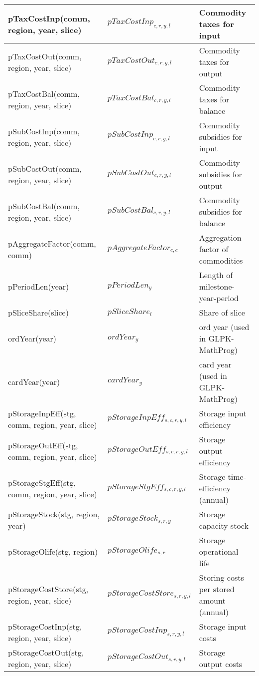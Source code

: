 \documentclass{article}
\begin{document}
\begin{longtable}{|p{10cm}|p{5cm}|p{9cm}|}
 \hline
pTaxCostInp(comm, region, year, slice) & $pTaxCostInp_{c,r,y,l}$ & Commodity taxes for input \\ 
 \hline
pTaxCostOut(comm, region, year, slice) & $pTaxCostOut_{c,r,y,l}$ & Commodity taxes for output \\ 
 \hline
pTaxCostBal(comm, region, year, slice) & $pTaxCostBal_{c,r,y,l}$ & Commodity taxes for balance \\ 
 \hline
pSubCostInp(comm, region, year, slice) & $pSubCostInp_{c,r,y,l}$ & Commodity subsidies for input \\ 
 \hline
pSubCostOut(comm, region, year, slice) & $pSubCostOut_{c,r,y,l}$ & Commodity subsidies for output \\ 
 \hline
pSubCostBal(comm, region, year, slice) & $pSubCostBal_{c,r,y,l}$ & Commodity subsidies for balance \\ 
 \hline
pAggregateFactor(comm, comm) & $pAggregateFactor_{c,c}$ & Aggregation factor of commodities \\ 
 \hline
pPeriodLen(year) & $pPeriodLen_{y}$ & Length of milestone-year-period \\ 
 \hline
pSliceShare(slice) & $pSliceShare_{l}$ & Share of slice \\ 
 \hline
ordYear(year) & $ordYear_{y}$ & ord year (used in GLPK-MathProg) \\ 
 \hline
cardYear(year) & $cardYear_{y}$ & card year (used in GLPK-MathProg) \\ 
 \hline
pStorageInpEff(stg, comm, region, year, slice) & $pStorageInpEff_{s,c,r,y,l}$ & Storage input efficiency \\ 
 \hline
pStorageOutEff(stg, comm, region, year, slice) & $pStorageOutEff_{s,c,r,y,l}$ & Storage output efficiency \\ 
 \hline
pStorageStgEff(stg, comm, region, year, slice) & $pStorageStgEff_{s,c,r,y,l}$ & Storage time-efficiency (annual) \\ 
 \hline
pStorageStock(stg, region, year) & $pStorageStock_{s,r,y}$ & Storage capacity stock \\ 
 \hline
pStorageOlife(stg, region) & $pStorageOlife_{s,r}$ & Storage operational life \\ 
 \hline
pStorageCostStore(stg, region, year, slice) & $pStorageCostStore_{s,r,y,l}$ & Storing costs per stored amount (annual) \\ 
 \hline
pStorageCostInp(stg, region, year, slice) & $pStorageCostInp_{s,r,y,l}$ & Storage input costs \\ 
 \hline
pStorageCostOut(stg, region, year, slice) & $pStorageCostOut_{s,r,y,l}$ & Storage output costs \\ 

\end{longtable}
\end{document}
